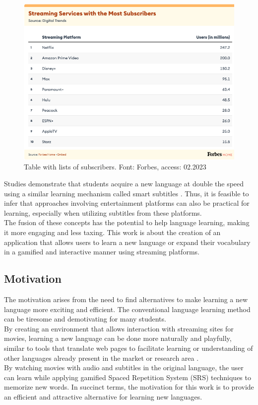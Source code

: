 \documentclass[12pt]{article}
\begin{document}
\begin{figure}[!h]
\centering
\caption{Table with lists of subscribers. Font: Forbes, access: 02.2023}
\label{fig:subscribers_table}
\includegraphics[width=1\textwidth]{assets/29.png}
\end{figure} 

Studies demonstrate that students acquire a new language at double the speed using a similar learning mechanism called smart subtitles \cite{Kovacs13}. Thus, it is feasible to infer that approaches involving entertainment platforms can also be practical for learning, especially when utilizing subtitles from these platforms. \\
The fusion of these concepts has the potential to help language learning, making it more engaging and less taxing. This work is about the creation of an application that allows users to learn a new language or expand their vocabulary in a gamified and interactive manner using streaming platforms.




\subsection{Motivation}
The motivation arises from the need to find alternatives to make learning a new language more exciting and efficient. The conventional language learning method can be tiresome and demotivating for many students. \\
By creating an environment that allows interaction with streaming sites for movies, learning a new language can be done more naturally and playfully, similar to tools that translate web pages to facilitate learning or understanding of other languages already present in the market or research area \cite{ElBatanony21}. \\
By watching movies with audio and subtitles in the original language, the user can learn while applying gamified Spaced Repetition System (SRS) techniques to memorize new words. In succinct terms, the motivation for this work is to provide an efficient and attractive alternative for learning new languages.
\end{document}
